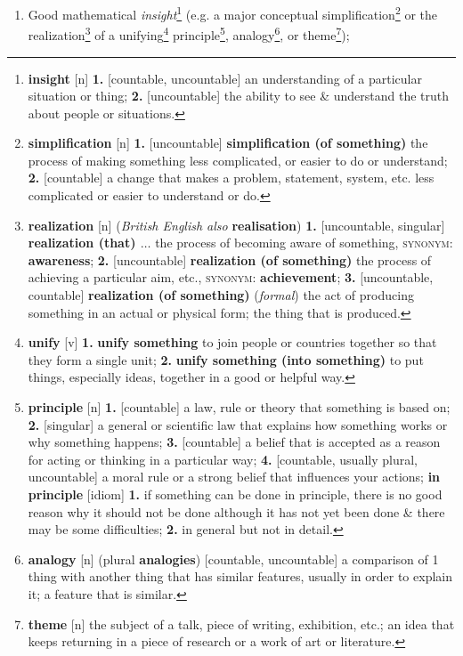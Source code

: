 \documentclass[oneside]{book}
\numberwithin{equation}{section}
\begin{document}
\begin{enumerate}
	\item Good mathematical \textit{insight}\footnote{\textbf{insight} [n] \textbf{1.} [countable, uncountable] an understanding of a particular situation or thing; \textbf{2.} [uncountable] the ability to see \& understand the truth about people or situations.} (e.g. a major conceptual simplification\footnote{\textbf{simplification} [n] \textbf{1.} [uncountable] \textbf{simplification (of something)} the process of making something less complicated, or easier to do or understand; \textbf{2.} [countable] a change that makes a problem, statement, system, etc. less complicated or easier to understand or do.} or the realization\footnote{\textbf{realization} [n] (\textit{British English also} \textbf{realisation}) \textbf{1.} [uncountable, singular] \textbf{realization (that) $\ldots$} the process of becoming aware of something, \textsc{synonym}: \textbf{awareness}; \textbf{2.} [uncountable] \textbf{realization (of something)} the process of achieving a particular aim, etc., \textsc{synonym}: \textbf{achievement}; \textbf{3.} [uncountable, countable] \textbf{realization (of something)} (\textit{formal}) the act of producing something in an actual or physical form; the thing that is produced.} of a unifying\footnote{\textbf{unify} [v] \textbf{1.} \textbf{unify something} to join people or countries together so that they form a single unit; \textbf{2.} \textbf{unify something (into something)} to put things, especially ideas, together in a good or helpful way.} principle\footnote{\textbf{principle} [n] \textbf{1.} [countable] a law, rule or theory that something is based on; \textbf{2.} [singular] a general or scientific law that explains how something works or why something happens; \textbf{3.} [countable] a belief that is accepted as a reason for acting or thinking in a particular way; \textbf{4.} [countable, usually plural, uncountable] a moral rule or a strong belief that influences your actions; \textbf{in principle} [idiom] \textbf{1.} if something can be done in principle, there is no good reason why it should not be done although it has not yet been done \& there may be some difficulties; \textbf{2.} in general but not in detail.}, analogy\footnote{\textbf{analogy} [n] (plural \textbf{analogies}) [countable, uncountable] a comparison of 1 thing with another thing that has similar features, usually in order to explain it; a feature that is similar.}, or theme\footnote{\textbf{theme} [n] the subject of a talk, piece of writing, exhibition, etc.; an idea that keeps returning in a piece of research or a work of art or literature.});

\end{enumerate}
\end{document}
